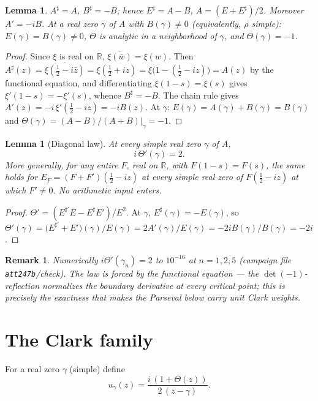 \documentclass[11pt]{article}
\newtheorem{lemma}[theorem]{Lemma}
\newtheorem{remark}[theorem]{Remark}
\newcommand{\R}{\mathbb{R}}
\newcommand{\Th}{\Theta}
\begin{document}
\begin{lemma}\label{lem:fe}
$A^\sharp=A$, $B^\sharp=-B$; hence $E^\sharp=A-B$, $A=(E+E^\sharp)/2$.
Moreover $A'=-iB$. At a real zero $\gamma$ of $A$ with $B(\gamma)\neq0$
(equivalently, $\rho$ simple): $E(\gamma)=B(\gamma)\neq0$, $\Th$ is analytic in
a neighborhood of $\gamma$, and $\Th(\gamma)=-1$.
\end{lemma}

\begin{proof}
Since $\xi$ is real on $\R$, $\overline{\xi(\bar w)}=\xi(w)$. Then
$A^\sharp(z)=\overline{\xi(\tfrac12-i\bar z)}=\xi(\tfrac12+iz)
=\xi\big(1-(\tfrac12-iz)\big)=A(z)$ by the functional equation, and
differentiating $\xi(1-s)=\xi(s)$ gives $\xi'(1-s)=-\xi'(s)$, whence
$B^\sharp=-B$. The chain rule gives $A'(z)=-i\,\xi'(\tfrac12-iz)=-iB(z)$.
At $\gamma$: $E(\gamma)=A(\gamma)+B(\gamma)=B(\gamma)$ and
$\Th(\gamma)=(A-B)/(A+B)\big|_{\gamma}=-1$.
\end{proof}

\begin{lemma}[Diagonal law]\label{lem:diag}
At every simple real zero $\gamma$ of $A$,
\[ i\,\Th'(\gamma)=2. \]
More generally, for any entire $F$, real on $\R$, with $F(1-s)=F(s)$, the same
holds for $E_F=(F+F')(\tfrac12-iz)$ at every simple real zero of
$F(\tfrac12-iz)$ at which $F'\neq0$. No arithmetic input enters.
\end{lemma}

\begin{proof}
$\Th'=(E^{\sharp\prime}E-E^\sharp E')/E^2$. At $\gamma$,
$E^\sharp(\gamma)=-E(\gamma)$, so
$\Th'(\gamma)=\big(E^{\sharp\prime}+E'\big)(\gamma)/E(\gamma)
=2A'(\gamma)/E(\gamma)=-2iB(\gamma)/B(\gamma)=-2i$.
\end{proof}

\begin{remark}
Numerically $i\Th'(\gamma_n)=2$ to $10^{-16}$ at $n=1,2,5$ (campaign file
\texttt{att247b}/check). The law is forced by the functional equation --- the
$\det(-1)$-reflection normalizes the boundary derivative at every critical
point; this is precisely the exactness that makes the Parseval below carry
\emph{unit} Clark weights.
\end{remark}

\section{The Clark family}

For a real zero $\gamma$ (simple) define
\[ u_\gamma(z)=\frac{i\,(1+\Th(z))}{2\,(z-\gamma)} . \]
\end{document}
